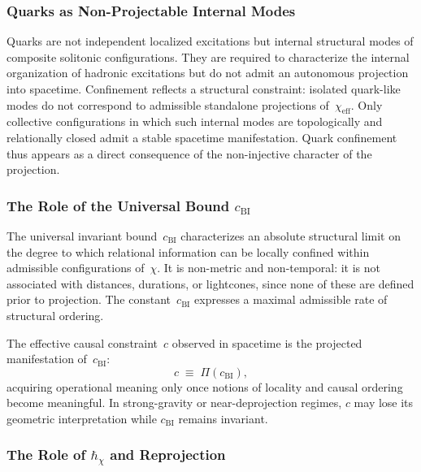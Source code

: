   \subsubsection*{Quarks as Non-Projectable Internal Modes}
    \label{subsec:quarks-non-projectable-modes}

    Quarks are not independent localized excitations but internal structural
    modes of composite solitonic configurations.
    They are required to characterize the internal organization of hadronic
    excitations but do not admit an autonomous projection into spacetime.
    Confinement reflects a structural constraint: isolated quark-like modes do
    not correspond to admissible standalone projections
    of~$\chi_{\mathrm{eff}}$.
    Only collective configurations in which such internal modes are
    topologically and relationally closed admit a stable spacetime
    manifestation.
    Quark confinement thus appears as a direct consequence of the non-injective
    character of the projection.

  \subsubsection*{The Role of the Universal Bound
  \texorpdfstring{$c_{\mathrm{BI}}$}{cχ}}
    \label{subsec:role-of-cchi}

    The universal invariant bound~$c_{\mathrm{BI}}$ characterizes an absolute structural
    limit on the degree to which relational information can be locally confined
    within admissible configurations of~$\chi$.
    It is non-metric and non-temporal: it is not associated with distances,
    durations, or lightcones, since none of these are defined prior to
    projection.
    The constant~$c_{\mathrm{BI}}$ expresses a maximal admissible rate of structural
    ordering.

    The effective causal constraint~$c$ observed in spacetime is the projected
    manifestation of~$c_{\mathrm{BI}}$:
    \[
      c \;\equiv\; \Pi(c_{\mathrm{BI}}),
    \]
    acquiring operational meaning only once notions of locality and causal
    ordering become meaningful.
    In strong-gravity or near-deprojection regimes, $c$ may lose its geometric
    interpretation while $c_{\mathrm{BI}}$ remains invariant.

  \subsubsection*{The Role of
  \texorpdfstring{$\hbar_{\chi}$}{ℏχ} and Reprojection}
    \label{subsec:the-role-of-hbar_chi-and-reprojection-from-chi}

